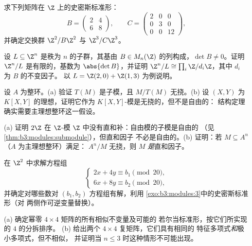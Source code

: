 \begin{exercise}[$\star$]\label{exo:b3:modules:3}
求下列矩阵在 $\Z$ 上的史密斯标准形：
\[
B = \begin{pmatrix} 2 & 4\\ 6 & 8 \end{pmatrix},
\qquad
C = \begin{pmatrix} 2 & 0 & 0\\ 0 & 3 & 0\\ 0 & 0 & 12
\end{pmatrix},
\]
并确定交换群 $\Z^2/B\Z^2$ 与 $\Z^3/C\Z^3$。
\end{exercise}

\begin{exercise}[$\star\star$]\label{exo:b3:modules:4}
设 $L \subseteq \Z^n$ 是秩为 $n$ 的子群，其基由
$B \in M_n(\Z)$ 的列构成，$\det B \neq 0$。证明
$\Z^n/L$ 是有限的，基数为 $\abs{\det B}$，并证明 $\Z^n/L
\cong \prod_i \Z/d_i\Z$，其中 $d_i$ 为 $B$ 的不变因子。
以 $L = \Z(2,0) + \Z(1,3)$ 为例说明。
\end{exercise}

\begin{exercise}[$\star\star$]\label{exo:b3:modules:5}
设 $A$ 为整环。(a) 验证 $T(M)$ 是子模，且
$M/T(M)$ 无挠。(b) 设 $(X, Y)$ 为 $K[X,Y]$ 的理想，证明它作为
$K[X,Y]$-模是无挠的，但不是自由的：
结构定理确实需要主理想整环这一假设。
\end{exercise}

\begin{exercise}[$\star\star$]\label{exo:b3:modules:6}
(a) 证明 $2\Z$ 在 $\Z$-模
$\Z$ 中没有直和补：自由模的子模是自由的
（见\cref{thm:b3:modules:submodule}），但直和因子
不必是自由的。(b) 证明：若 $M \subseteq A^n$（$A$ 为主理想整环）满足：
$A^n/M$ 无挠，则 $M$ \emph{是}直和因子。
\end{exercise}

\begin{exercise}[$\star\star$]\label{exo:b3:modules:7}
在 $\Z^2$ 中求解方程组
\[
\begin{cases}
2x + 4y \equiv b_1 \pmod{20},\\
6x + 8y \equiv b_2 \pmod{20},
\end{cases}
\]
并确定对哪些数对 $(b_1, b_2)$ 方程组有解，利用
\cref{exo:b3:modules:3}中的史密斯标准形（对
两侧作可逆变量替换）。
\end{exercise}

\begin{exercise}[$\star\star$]\label{exo:b3:modules:8}
(a) 确定幂零 $4 \times 4$ 矩阵的所有相似不变量及可能的
若尔当标准形，按它们所实现的
$4$ 的分拆排序。
(b) 给出两个 $4\times4$ 复矩阵，它们具有相同的
特征多项式\emph{和}极小多项式，但不相似，
并证明当 $n \leq 3$ 时这种情形不可能出现。
\end{exercise}

